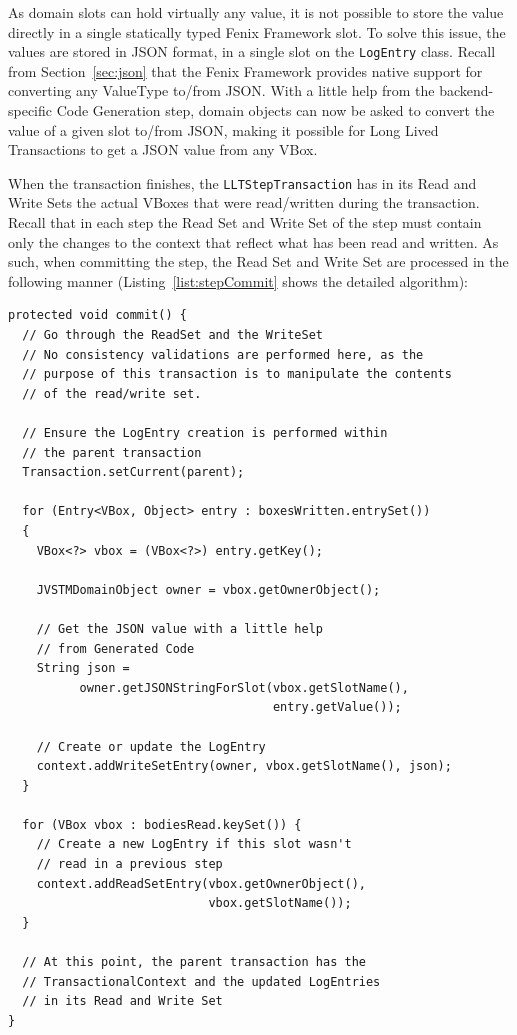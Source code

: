 \documentclass{llncs}
\begin{document}
As domain slots can hold virtually any value, it is not possible to
store the value directly in a single statically typed Fenix Framework
slot. To solve this issue, the values are stored in JSON format, in a
single slot on the \texttt{LogEntry} class. Recall from
Section~\ref{sec:json} that the Fenix Framework provides native
support for converting any ValueType to/from JSON. With a little help
from the backend-specific Code Generation step, domain objects can now
be asked to convert the value of a given slot to/from JSON, making it
possible for Long Lived Transactions to get a JSON value from any
VBox.

When the transaction finishes, the \texttt{LLTStepTransaction} has in
its Read and Write Sets the actual VBoxes that were read/written
during the transaction. Recall that in each step the Read Set and
Write Set of the step must contain only the changes to the context
that reflect what has been read and written. As such, when committing
the step, the Read Set and Write Set are processed in the following
manner (Listing~\ref{list:stepCommit} shows the detailed algorithm):

\begin{lstlisting}[caption={Algorithm for committing a Long Lived
    Transaction's step}, label={list:stepCommit}, float]
protected void commit() {
  // Go through the ReadSet and the WriteSet
  // No consistency validations are performed here, as the 
  // purpose of this transaction is to manipulate the contents
  // of the read/write set.

  // Ensure the LogEntry creation is performed within
  // the parent transaction
  Transaction.setCurrent(parent);

  for (Entry<VBox, Object> entry : boxesWritten.entrySet()) 
  {
    VBox<?> vbox = (VBox<?>) entry.getKey();

    JVSTMDomainObject owner = vbox.getOwnerObject();

    // Get the JSON value with a little help
    // from Generated Code
    String json = 
          owner.getJSONStringForSlot(vbox.getSlotName(), 
                                     entry.getValue());

    // Create or update the LogEntry
    context.addWriteSetEntry(owner, vbox.getSlotName(), json);
  }

  for (VBox vbox : bodiesRead.keySet()) {
    // Create a new LogEntry if this slot wasn't
    // read in a previous step
    context.addReadSetEntry(vbox.getOwnerObject(), 
                            vbox.getSlotName());
  }

  // At this point, the parent transaction has the 
  // TransactionalContext and the updated LogEntries
  // in its Read and Write Set
}
\end{lstlisting}
\end{document}
